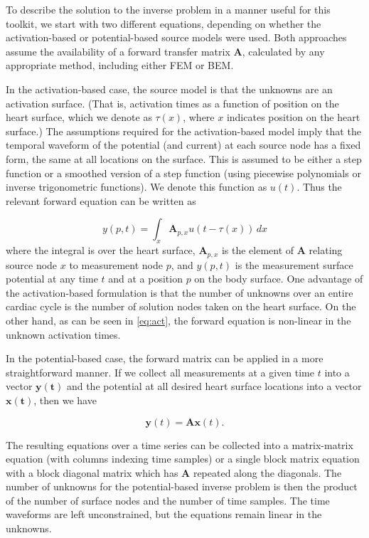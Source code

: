 To describe the solution to the inverse problem in a manner useful for this
toolkit, we start with two different equations, depending on whether the
activation-based or potential-based source models were used. Both
approaches assume the availability of a forward transfer matrix
$\mathbf{A}$, calculated by any appropriate method, including either FEM or
BEM.

In the activation-based case, the source model is that the unknowns
are an activation surface. (That is, activation times as a function of
position on the heart surface, which we denote as $\tau(x)$, where $x$
indicates position on the heart surface.) The assumptions required for
the activation-based model imply that the temporal waveform of the
potential (and current) at each source node has a fixed form, the same
at all locations on the surface. This is assumed to be either a step
function or a smoothed version of a step function (using piecewise
polynomials or inverse trigonometric functions). We denote this
function as $u(t)$. Thus the relevant forward equation can be written
as

\begin{equation} y(p,t) = \int_{x} \mathbf{A}_{p,x}u(t-\tau(x))\,dx \label{eq:act}
\end{equation}
%
\noindent where the integral is over the heart surface, $\mathbf{A}_{p,x}$ is the
element of $\mathbf{A}$ relating source node $x$ to measurement node $p$,
and $y(p,t)$ is the measurement surface potential at any time $t$ and at a
position $p$ on the body surface. One advantage of the activation-based
formulation is that the number of unknowns over an entire cardiac cycle is
the number of solution nodes taken on the heart surface. On the other hand,
as can be seen in \autoref{eq:act}, the forward equation is non-linear in
the unknown activation times.

In the potential-based case, the forward matrix can be applied in a more
straightforward manner. If we collect all measurements at a given time $t$ into
a vector $\mathbf{y(t)}$ and the potential at all desired heart surface locations
into a vector $\mathbf{x(t)}$, then we have

\begin{equation} \mathbf{y}(t) = \mathbf{A}\mathbf{x}(t).\label{eq:TransMat}
\end{equation}

The resulting equations over a time series can be collected into a
matrix-matrix equation (with columns indexing time samples) or a single
block matrix equation with a block diagonal matrix which has $\mathbf{A}$
repeated along the diagonals. The number of unknowns for the potential-based
inverse problem is then the product of the number of surface nodes and the
number of time samples. The time waveforms are left unconstrained, but
the equations remain linear in the unknowns.

